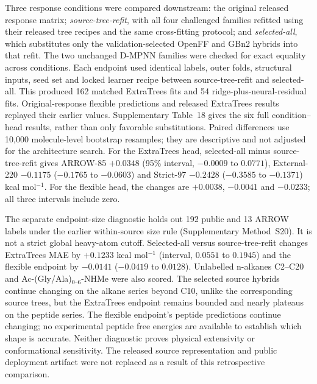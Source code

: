 Three response conditions were compared downstream: the original released
response matrix; \emph{source-tree-refit}, with all four challenged families
refitted using their released tree recipes and the same cross-fitting protocol;
and \emph{selected-all}, which substitutes only the validation-selected OpenFF
and GBn2 hybrids into that refit. The two unchanged D-MPNN families were checked
for exact equality across conditions. Each endpoint used identical labels,
outer folds, structural inputs, seed set and locked learner recipe between
source-tree-refit and selected-all. This produced 162 matched ExtraTrees fits
and 54 ridge-plus-neural-residual fits. Original-response flexible predictions
and released ExtraTrees results replayed their earlier values. Supplementary
Table~18 gives the six full condition--head results, rather than only favorable
substitutions. Paired differences use 10,000 molecule-level bootstrap resamples;
they are descriptive and not adjusted for the architecture search. For the
ExtraTrees head, selected-all minus source-tree-refit gives ARROW-85 $+0.0348$
(95\% interval, $-0.0009$ to $0.0771$), External-220 $-0.1175$
($-0.1765$ to $-0.0603$) and Strict-97 $-0.2428$
($-0.3585$ to $-0.1371$) kcal mol$^{-1}$. For the flexible head, the changes
are $+0.0038$, $-0.0041$ and $-0.0233$; all three intervals include zero.

The separate endpoint-size diagnostic holds out 192 public and 13 ARROW labels
under the earlier within-source size rule (Supplementary Method~S20). It is not
a strict global heavy-atom cutoff. Selected-all versus source-tree-refit changes
ExtraTrees MAE by $+0.1233$ kcal mol$^{-1}$ (interval, $0.0551$ to $0.1945$)
and the flexible endpoint by $-0.0141$ ($-0.0419$ to $0.0128$). Unlabelled
n-alkanes C2--C20 and Ac-(Gly/Ala)$_{0\text{--}6}$-NHMe were also scored. The
selected source hybrids continue changing on the alkane series beyond C10,
unlike the corresponding source trees, but the ExtraTrees endpoint remains
bounded and nearly plateaus on the peptide series. The flexible endpoint's
peptide predictions continue changing; no experimental peptide free energies
are available to establish which shape is accurate. Neither diagnostic proves
physical extensivity or conformational sensitivity. The released source
representation and public deployment artifact were not replaced as a result of
this retrospective comparison.
